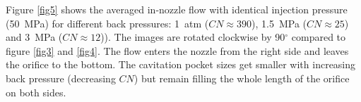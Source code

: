 \documentclass[letterpaper,twocolumn,10pt]{ilass}
\begin{document}

%
Figure \ref{fig5} shows the averaged in-nozzle flow with identical injection pressure (50~MPa)
for different back pressures: 1~atm ($CN \approx 390$), 1.5~MPa ($CN \approx 25$) and 3~MPa
($CN \approx 12$)). The images are rotated clockwise by 90$^{\circ}$ compared to figure
\ref{fig3} and \ref{fig4}. The flow enters the nozzle from the right side and leaves the
orifice to the bottom. \newline
The cavitation pocket sizes get smaller with increasing back pressure
(decreasing $CN$) but remain filling the whole length of the orifice on both sides.
%




\end{document}
